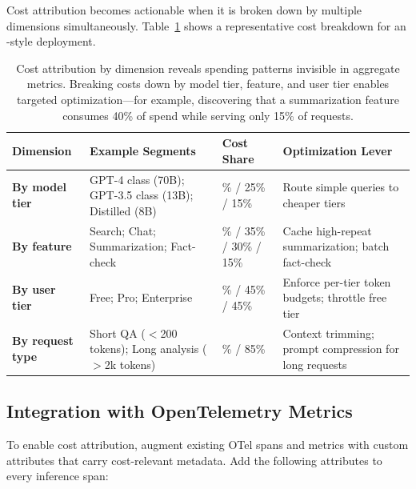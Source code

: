 Cost attribution becomes actionable when it is broken down by multiple dimensions simultaneously. Table~\ref{tab:ch05_cost_attribution} shows a representative cost breakdown for an \ishtar{}-style deployment.

\begin{table}[t]
\centering
\small
\caption{Cost attribution by dimension reveals spending patterns invisible in aggregate metrics. Breaking costs down by model tier, feature, and user tier enables targeted optimization---for example, discovering that a summarization feature consumes 40\% of spend while serving only 15\% of requests.}
\label{tab:ch05_cost_attribution}
\setlength{\tabcolsep}{6pt}
\renewcommand{\arraystretch}{1.3}
\begin{tabularx}{\linewidth}{@{}>{\raggedright\arraybackslash}p{2.8cm}>{\raggedright\arraybackslash}X>{\raggedright\arraybackslash}p{2cm}>{\raggedright\arraybackslash}p{2.2cm}@{}}
\toprule
\rowcolor{gray!15}
\textbf{Dimension} & \textbf{Example Segments} & \textbf{Cost Share} & \textbf{Optimization Lever} \\
\midrule
\textbf{By model tier} & GPT-4 class (70B); GPT-3.5 class (13B); Distilled (8B) & 60\% / 25\% / 15\% & Route simple queries to cheaper tiers \\
\addlinespace[2pt]
\textbf{By feature} & Search; Chat; Summarization; Fact-check & 20\% / 35\% / 30\% / 15\% & Cache high-repeat summarization; batch fact-check \\
\addlinespace[2pt]
\textbf{By user tier} & Free; Pro; Enterprise & 10\% / 45\% / 45\% & Enforce per-tier token budgets; throttle free tier \\
\addlinespace[2pt]
\textbf{By request type} & Short QA ($<$200 tokens); Long analysis ($>$2k tokens) & 15\% / 85\% & Context trimming; prompt compression for long requests \\
\bottomrule
\end{tabularx}
\end{table}

\subsection{Integration with OpenTelemetry Metrics}
\label{subsec:ch05-cost-otel-integration}

To enable cost attribution, augment existing OTel spans and metrics with custom attributes that carry cost-relevant metadata. Add the following attributes to every inference span:

